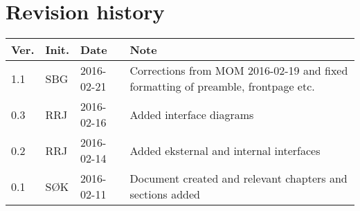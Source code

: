 \label{chp_revisionHistory}
\chapter{Revision history}

\begin{tabular}{b{1cm} b{1cm} b{2cm} b{8cm}}
	\textbf{Ver.} & \textbf{Init.} & \textbf{Date} & \textbf{Note}\\
	\hline
    1.1 & SBG & 2016-02-21 & Corrections from MOM 2016-02-19 and fixed formatting of preamble, frontpage etc.\\
    0.3 & RRJ & 2016-02-16 & Added interface diagrams \\
    0.2 & RRJ & 2016-02-14 & Added eksternal and internal interfaces \\
    0.1 & SØK & 2016-02-11 & Document created and relevant chapters and sections added \\
\end{tabular}

